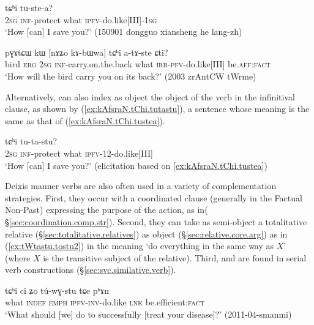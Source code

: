  \begin{exe}
\ex \label{ex:kAfsraN.tChi.tustea}
 tɕʰi tu-ste-a? \\
\textsc{2sg} \textsc{inf}-protect what \textsc{ipfv}-do.like[III]-\textsc{1sg} \\
\glt `How [can] I save you?' (150901 dongguo xiansheng he lang-zh)
\end{exe} 

 \begin{exe}
\ex \label{ex:kAbWwa.tChi.atAste}
\gll pɣɤtɕɯ kɯ [nɤʑo kɤ-bɯwa] tɕʰi a-tɤ-ste ɕti? \\
bird \textsc{erg} \textsc{2sg} \textsc{inf}-carry.on.the.back what \textsc{irr}-\textsc{pfv}-do.like[III] be.\textsc{aff}:\textsc{fact} \\
\glt `How will the bird carry you on its back?' (2003 zrAntCW tWrme)
\end{exe} 


Alternatively,  can also index as object the object of the verb in the infinitival clause, as shown by (\ref{ex:kAfsraN.tChi.tutastu}), a sentence whose meaning is the same as that of (\ref{ex:kAfsraN.tChi.tustea}).

 \begin{exe}
\ex \label{ex:kAfsraN.tChi.tutastu}
 tɕʰi tu-ta-stu? \\
\textsc{2sg} \textsc{inf}-protect what \textsc{ipfv}-1\fl{}2-do.like[III]  \\
\glt `How [can] I save you?' (elicitation based on \ref{ex:kAfsraN.tChi.tustea})
\end{exe} 

Deixis manner verbs are also often used in a variety of complementation strategies. First, they occur with a coordinated clause (generally in the Factual Non-Past) expressing the purpose of the action, as in( §\ref{sec:coordination.comp.str}). Second, they can take as semi-object a totalitative relative (§\ref{sec:totalitative.relatives}) as object (§\ref{sec:relative.core.arg}) as in (\ref{ex:tWtastu.tostu2}) in the meaning `do everything in the same way as $X$' (where $X$ is the transitive subject of the relative). Third,  and  are found in serial verb constructions (§\ref{sec:svc.similative.verb}).

 \begin{exe}
\ex \label{ex:tChi.tuwGstu}
\gll tɕʰi ci ʑo tú-wɣ-stu tɕe pʰɤn \\
what \textsc{indef} \textsc{emph} \textsc{ipfv}-\textsc{inv}-do.like \textsc{lnk} be.efficient:\textsc{fact} \\
\glt `What should [we] do to successfully [treat your disease]?' (2011-04-smanmi)
\end{exe} 

